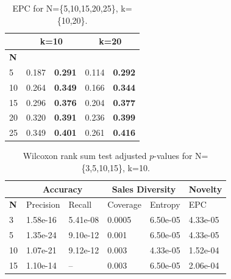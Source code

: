 \begin{table}[t]
	\footnotesize
	\caption{EPC for N=\{5,10,15,20,25\}, k=\{10,20\}.}
	\centering
	\begin{tabular}{|p{0.8cm}||p{1.2cm}|p{1.2cm}||p{1.2cm}|p{1.2cm}|} \hline	
		& \multicolumn{2}{c||}{\textbf{k=10}}  & \multicolumn{2}{c|}{\textbf{k=20}} \\ \hline
		\textbf{N}	& \LR    & \CR  & \LR    & \CR	  \\ \hline	
		5       & 0.187	   	 & \textbf{0.291}  	& 0.114	 		& \textbf{0.292}    \\ \hline
		10      & 0.264      & \textbf{0.349}  	& 0.166  		& \textbf{0.344}    \\ \hline
		15      & 0.296      & \textbf{0.376}  	& 0.204 		& \textbf{0.377}    \\ \hline
		20      & 0.320      & \textbf{0.391}  	& 0.236 		& \textbf{0.399}    \\ \hline
		25      & 0.349      & \textbf{0.401}  	& 0.261 		& \textbf{0.416}    \\ \hline
	\end{tabular}
	\label{tab:EPC}
\end{table}



\begin{table}[h!]
	\footnotesize
	\caption{Wilcoxon rank sum test adjusted $p$-values for N=\{3,5,10,15\}, 
		k=10.}
	\centering
	\begin{tabular}{|p{0.8cm}||p{1.2cm}|p{1.2cm}||p{1.2cm}|p{1.2cm}||p{1.2cm}|} \hline	
		& \multicolumn{2}{c||}{\textbf{Accuracy}} &  \multicolumn{2}{c||}{\textbf{Sales Diversity}}   & \textbf{Novelty}  \\ \hline
		\textbf{N} & Precision  &  Recall   & Coverage   & 	Entropy  & EPC \\\hline
		3          & 1.58e-16&5.41e-08 & 0.0005 & 6.50e-05& 4.33e-05 \\\hline
		5          & 1.35e-24& 9.10e-12 & 0.001 & 6.50e-05& 4.33e-05 \\\hline
		10         & 1.07e-21& 9.12e-12 & 0.003& 4.33e-05& 1.52e-04 \\\hline
		15         &  1.10e-14 & -- & 0.003& 6.50e-05& 2.06e-04 \\\hline
	\end{tabular}
	\label{tab:Wilcoxon}
\end{table}
%


